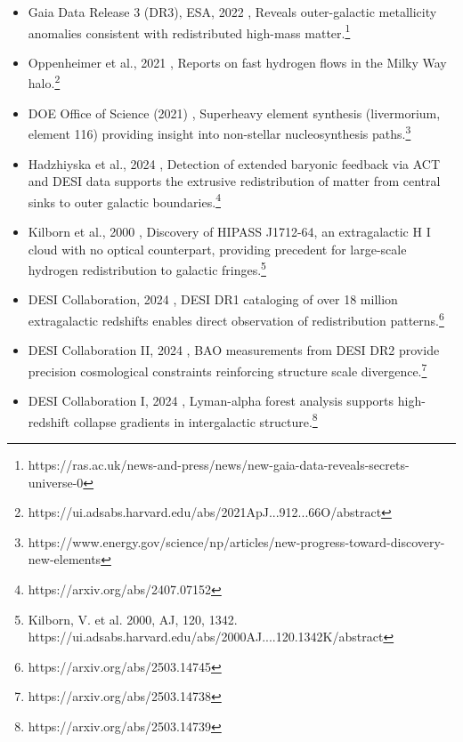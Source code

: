 \begin{itemize}
    \item Gaia Data Release 3 (DR3), ESA, 2022 ,  Reveals outer-galactic metallicity anomalies consistent with redistributed high-mass matter.\footnote{https://ras.ac.uk/news-and-press/news/new-gaia-data-reveals-secrets-universe-0}
    \item Oppenheimer et al., 2021 ,  Reports on fast hydrogen flows in the Milky Way halo.\footnote{https://ui.adsabs.harvard.edu/abs/2021ApJ...912...66O/abstract}
    \item DOE Office of Science (2021) ,  Superheavy element synthesis (livermorium, element 116) providing insight into non-stellar nucleosynthesis paths.\footnote{https://www.energy.gov/science/np/articles/new-progress-toward-discovery-new-elements}
    \item Hadzhiyska et al., 2024 ,  Detection of extended baryonic feedback via ACT and DESI data supports the extrusive redistribution of matter from central sinks to outer galactic boundaries.\footnote{https://arxiv.org/abs/2407.07152}
    \item Kilborn et al., 2000 ,  Discovery of HIPASS J1712-64, an extragalactic H I cloud with no optical counterpart, providing precedent for large-scale hydrogen redistribution to galactic fringes.\footnote{Kilborn, V. et al. 2000, AJ, 120, 1342. https://ui.adsabs.harvard.edu/abs/2000AJ....120.1342K/abstract}
    \item DESI Collaboration, 2024 ,  DESI DR1 cataloging of over 18 million extragalactic redshifts enables direct observation of redistribution patterns.\footnote{https://arxiv.org/abs/2503.14745}
    \item DESI Collaboration II, 2024 ,  BAO measurements from DESI DR2 provide precision cosmological constraints reinforcing structure scale divergence.\footnote{https://arxiv.org/abs/2503.14738}
    \item DESI Collaboration I, 2024 ,  Lyman-alpha forest analysis supports high-redshift collapse gradients in intergalactic structure.\footnote{https://arxiv.org/abs/2503.14739}
  \end{itemize}
  

  
  \nocite{chapter7_meta}
\printbibliography[title={Appendix F References}, keyword=chapter7]
